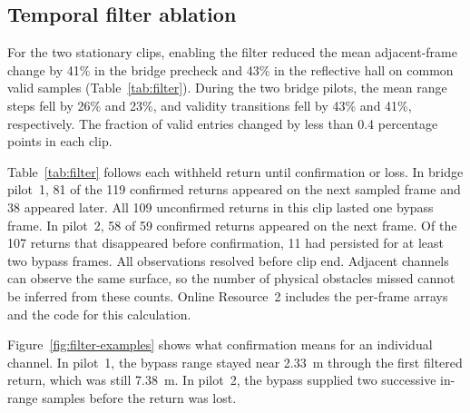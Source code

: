 \documentclass[pdflatex,sn-mathphys-num]{sn-jnl}
\begin{document}
\subsection{Temporal filter ablation}\label{sec:filter-results}

For the two stationary clips, enabling the filter reduced the mean adjacent-frame change by 41\% in the bridge precheck and 43\% in the reflective hall on common valid samples (Table~\ref{tab:filter}). During the two bridge pilots, the mean range steps fell by 26\% and 23\%, and validity transitions fell by 43\% and 41\%, respectively. The fraction of valid entries changed by less than 0.4 percentage points in each clip.

Table~\ref{tab:filter} follows each withheld return until confirmation or loss. In bridge pilot~1, 81 of the 119 confirmed returns appeared on the next sampled frame and 38 appeared later. All 109 unconfirmed returns in this clip lasted one bypass frame. In pilot~2, 58 of 59 confirmed returns appeared on the next frame. Of the 107 returns that disappeared before confirmation, 11 had persisted for at least two bypass frames. All observations resolved before clip end. Adjacent channels can observe the same surface, so the number of physical obstacles missed cannot be inferred from these counts. Online Resource~2 includes the per-frame arrays and the code for this calculation.

Figure~\ref{fig:filter-examples} shows what confirmation means for an individual channel. In pilot~1, the bypass range stayed near 2.33~m through the first filtered return, which was still 7.38~m. In pilot~2, the bypass supplied two successive in-range samples before the return was lost.
\end{document}
